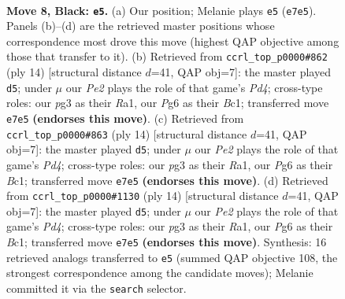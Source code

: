 \documentclass[11pt]{article}
\begin{document}
\begin{figure}[p]\centering
\begin{subfigure}{0.46\textwidth}\centering
\resizebox{\linewidth}{!}{%
\newchessgame
\chessboard[
  setfen={1rbq1rk1/pp1pppbp/2n2np1/2p5/2P4P/5NP1/PP1PPPB1/RNBQ1RK1 b - - 2 8},
  showmover=false,
  pgfstyle=straightmove, color=movearrow, markmove={e7-e5}
]}
\caption{}
\end{subfigure}\hfill
\begin{subfigure}{0.46\textwidth}\centering
\resizebox{\linewidth}{!}{%
\newchessgame
\chessboard[
  setfen={rnb1qrk1/ppp1p1bp/3p1np1/5p2/2PP4/2N2NP1/PP2PPBP/R1BQ1RK1 w - - 2 8},
  showmover=false,
  pgfstyle=straightmove, color=movearrow, markmove={d4-d5}
]}
\caption{}
\end{subfigure}
\\[4pt]
\begin{subfigure}{0.46\textwidth}\centering
\resizebox{\linewidth}{!}{%
\newchessgame
\chessboard[
  setfen={rnb1qrk1/ppp1p1bp/3p1np1/5p2/2PP4/2N2NP1/PP2PPBP/R1BQ1RK1 w - - 2 8},
  showmover=false,
  pgfstyle=straightmove, color=movearrow, markmove={d4-d5}
]}
\caption{}
\end{subfigure}\hfill
\begin{subfigure}{0.46\textwidth}\centering
\resizebox{\linewidth}{!}{%
\newchessgame
\chessboard[
  setfen={rnb1qrk1/ppp1p1bp/3p1np1/5p2/2PP4/2N2NP1/PP2PPBP/R1BQ1RK1 w - - 4 8},
  showmover=false,
  pgfstyle=straightmove, color=movearrow, markmove={d4-d5}
]}
\caption{}
\end{subfigure}
\caption{\textbf{Move 8, Black: \texttt{e5}.} (a) Our position; Melanie plays \texttt{e5} (\texttt{e7e5}). Panels (b)--(d) are the retrieved master positions whose correspondence most drove this move (highest QAP objective among those that transfer to it). (b) Retrieved from \texttt{ccrl\_top\_p0000\#862} (ply 14) [structural distance $d$=41, QAP obj=7]: the master played \texttt{d5}; under $\mu$ our \emph{Pe2} plays the role of that game's \emph{Pd4}; cross-type roles: our \emph{p}g3 as their \emph{R}a1, our \emph{P}g6 as their \emph{B}c1; transferred move \texttt{e7e5} \textbf{(endorses this move)}. (c) Retrieved from \texttt{ccrl\_top\_p0000\#863} (ply 14) [structural distance $d$=41, QAP obj=7]: the master played \texttt{d5}; under $\mu$ our \emph{Pe2} plays the role of that game's \emph{Pd4}; cross-type roles: our \emph{p}g3 as their \emph{R}a1, our \emph{P}g6 as their \emph{B}c1; transferred move \texttt{e7e5} \textbf{(endorses this move)}. (d) Retrieved from \texttt{ccrl\_top\_p0000\#1130} (ply 14) [structural distance $d$=41, QAP obj=7]: the master played \texttt{d5}; under $\mu$ our \emph{Pe2} plays the role of that game's \emph{Pd4}; cross-type roles: our \emph{p}g3 as their \emph{R}a1, our \emph{P}g6 as their \emph{B}c1; transferred move \texttt{e7e5} \textbf{(endorses this move)}. Synthesis: 16 retrieved analogs transferred to \texttt{e5} (summed QAP objective 108, the strongest correspondence among the candidate moves); Melanie committed it via the \texttt{search} selector.}
\label{fig:thought-m15}
\end{figure}
\end{document}
